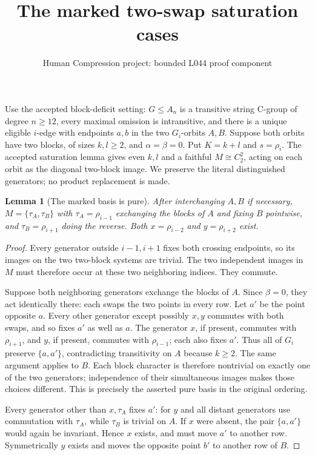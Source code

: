 \documentclass[11pt,a4paper]{article}
\title{The marked two-swap saturation cases}
\author{Human Compression project: bounded L044 proof component}
\date{}
\newtheorem{lemma}{Lemma}
\begin{document}
\maketitle
Use the accepted block-deficit setting: $G\leq A_n$ is a
transitive string C-group of degree $n\geq12$, every maximal omission is
intransitive, and there is a unique eligible $i$-edge with
endpoints $a,b$ in the two $G_i$-orbits $A,B$. Suppose both
orbits have two blocks, of sizes $k,l\geq2$, and
$\alpha=\beta=0$. Put $K=k+l$ and $s=\rho_i$.
The accepted saturation lemma gives even $k,l$ and a
faithful $M\cong C_2^2$, acting on each orbit as the diagonal
two-block image. We preserve the literal distinguished
generators; no product replacement is made.

\begin{lemma}[The marked basis is pure]
After interchanging $A,B$ if necessary,
$M=\{\tau_A,\tau_B\}$ with
$\tau_A=\rho_{i-1}$ exchanging the blocks of $A$ and fixing
$B$ pointwise, and $\tau_B=\rho_{i+1}$ doing the reverse.
Both $x=\rho_{i-2}$ and $y=\rho_{i+2}$ exist.
\end{lemma}
\begin{proof}
Every generator outside $i-1,i+1$ fixes both crossing
endpoints, so its images on the two two-block systems are
trivial. The two independent images in $M$ must therefore
occur at these two neighboring indices. They commute.

Suppose both neighboring generators exchange the blocks of
$A$. Since $\beta=0$, they act identically there: each swaps
the two points in every row. Let $a'$ be the point opposite
$a$. Every other generator except possibly $x,y$ commutes
with both swaps, and so fixes $a'$ as well as $a$.
The generator $x$, if present, commutes with $\rho_{i+1}$,
and $y$, if present, commutes with $\rho_{i-1}$; each also
fixes $a'$. Thus all of $G_i$ preserve $\{a,a'\}$,
contradicting transitivity on $A$ because $k\geq2$.
The same argument applies to $B$. Each block character is
therefore nontrivial on exactly one of the two generators;
independence of their simultaneous images makes those choices
different. This is precisely the asserted pure basis in the
original ordering.

Every generator other than $x,\tau_A$ fixes $a'$: for
$y$ and all distant generators use commutation with
$\tau_A$, while $\tau_B$ is trivial on $A$.
If $x$ were absent, the pair $\{a,a'\}$ would again be
invariant. Hence $x$ exists, and must move $a'$ to another
row. Symmetrically $y$ exists and moves the opposite point
$b'$ to another row of $B$.
\end{proof}
\end{document}
